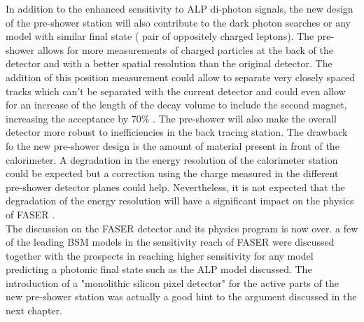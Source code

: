 		In addition to the enhanced sensitivity to ALP di-photon signals, the new design of the pre-shower station will also contribute to the dark photon searches or any model with similar final state ( pair of oppositely charged leptons). The pre-shower allows for more measurements of charged particles at the back of the detector and with a better spatial resolution than the original detector. The addition of this position measurement could allow to separate very closely spaced tracks which can't be separated with the current detector and could even allow for an increase of the length of the decay volume to include the second magnet, increasing the acceptance by 70$\%$ \cite{PreShower_TP}. The pre-shower will also make the overall detector more robust to inefficiencies in the back tracing station. 
		The drawback fo the new pre-shower design is the amount of material present in front of the calorimeter. A degradation in the energy resolution of the calorimeter station could be expected but a correction using the charge measured in the different pre-shower detector planes could help. Nevertheless, it is not expected that the degradation of the energy resolution will have a significant impact on the physics of FASER \cite{PreShower_TP}.\\
		
		The discussion on the FASER detector and its physics program is now over. a few of the leading BSM models in the sensitivity reach of FASER were discussed together with the prospects in reaching higher sensitivity for any model predicting a photonic final state such as the ALP model discussed. The introduction of a "monolithic silicon pixel detector" for the active parts of the new pre-shower station was actually a good hint to the argument discussed in the next chapter. 
		

		
		
		
		
		
		
		
		
		
		
		
		
		
		
		
		
		
		